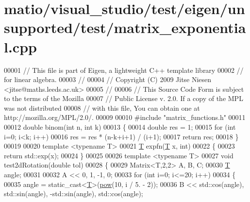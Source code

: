 \hypertarget{matio_2visual__studio_2test_2eigen_2unsupported_2test_2matrix__exponential_8cpp_source}{}\section{matio/visual\+\_\+studio/test/eigen/unsupported/test/matrix\+\_\+exponential.cpp}
\label{matio_2visual__studio_2test_2eigen_2unsupported_2test_2matrix__exponential_8cpp_source}

\begin{DoxyCode}
00001 \textcolor{comment}{// This file is part of Eigen, a lightweight C++ template library}
00002 \textcolor{comment}{// for linear algebra.}
00003 \textcolor{comment}{//}
00004 \textcolor{comment}{// Copyright (C) 2009 Jitse Niesen <jitse@maths.leeds.ac.uk>}
00005 \textcolor{comment}{//}
00006 \textcolor{comment}{// This Source Code Form is subject to the terms of the Mozilla}
00007 \textcolor{comment}{// Public License v. 2.0. If a copy of the MPL was not distributed}
00008 \textcolor{comment}{// with this file, You can obtain one at http://mozilla.org/MPL/2.0/.}
00009 
00010 \textcolor{preprocessor}{#include "matrix\_functions.h"}
00011 
00012 \textcolor{keywordtype}{double} binom(\textcolor{keywordtype}{int} n, \textcolor{keywordtype}{int} k)
00013 \{
00014   \textcolor{keywordtype}{double} res = 1;
00015   \textcolor{keywordflow}{for} (\textcolor{keywordtype}{int} i=0; i<k; i++)
00016     res = res * (n-k+i+1) / (i+1);
00017   \textcolor{keywordflow}{return} res;
00018 \}
00019 
00020 \textcolor{keyword}{template} <\textcolor{keyword}{typename} T>
00021 \hyperlink{group___sparse_core___module_class_eigen_1_1_triplet}{T} expfn(\hyperlink{group___sparse_core___module_class_eigen_1_1_triplet}{T} x, \textcolor{keywordtype}{int})
00022 \{
00023   \textcolor{keywordflow}{return} std::exp(x);
00024 \}
00025 
00026 \textcolor{keyword}{template} <\textcolor{keyword}{typename} T>
00027 \textcolor{keywordtype}{void} test2dRotation(\textcolor{keywordtype}{double} tol)
00028 \{
00029   Matrix<T,2,2> A, B, C;
00030   \hyperlink{group___sparse_core___module_class_eigen_1_1_triplet}{T} angle;
00031 
00032   A << 0, 1, -1, 0;
00033   \textcolor{keywordflow}{for} (\textcolor{keywordtype}{int} i=0; i<=20; i++)
00034   \{
00035     angle = \textcolor{keyword}{static\_cast<}\hyperlink{group___sparse_core___module_class_eigen_1_1_triplet}{T}\textcolor{keyword}{>}(\hyperlink{group___core___module_ab6dc101d82e8228a19a8840e3a29c1c9}{pow}(10, i / 5. - 2));
00036     B << std::cos(angle), std::sin(angle), -std::sin(angle), std::cos(angle);

\end{DoxyCode}
